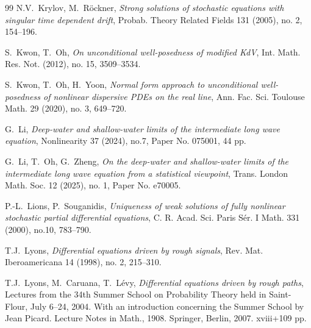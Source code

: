 \documentclass[letterpaper, 11pt,  reqno]{amsart}
\newcommand{\1}{\hspace{0.5mm}\text{I}\hspace{0.5mm}}
\numberwithin{equation}{section}
\numberwithin{theorem}{section}
\begin{document}
\begin{thebibliography}{99}
N.V.~Krylov,  M.~R\"ockner,
{\it Strong solutions of stochastic equations with singular time dependent drift},
Probab. Theory Related Fields 131 (2005), no. 2, 154--196. 



S.~Kwon, T.~Oh, 
{\it  On unconditional well-posedness of modified KdV}, Int. Math. Res. Not. (2012), no. 15, 3509--3534. 




S.~Kwon, T.~Oh, H.~Yoon, 
{\it Normal form approach to unconditional well-posedness of nonlinear dispersive PDEs on the real line}, Ann. Fac. Sci. Toulouse Math. 29 (2020), no. 3, 649--720. 



G.~Li, 
{\it Deep-water and shallow-water limits of the intermediate long wave equation}, 
 Nonlinearity 37 (2024), no.7, Paper No. 075001, 44 pp. 
 
 
G.~Li, T.~Oh, G.~Zheng,
{\it On the deep-water and shallow-water limits of the intermediate long wave equation from a statistical viewpoint}, 
Trans. London Math. Soc. 
 12 (2025), no. 1, Paper No. e70005. 




P.-L.~Lions, P.~Souganidis, 
{\it Uniqueness of weak solutions of fully nonlinear stochastic partial differential equations},
C. R. Acad. Sci. Paris S\'er. I Math. 331 (2000), no.10, 783--790.


T.J.~Lyons,
{\it Differential equations driven by rough signals},
Rev. Mat. Iberoamericana 14 (1998), no. 2, 215--310.




T.J.~Lyons, M.~Caruana, T.~L{\'e}vy,
{\it Differential equations driven by rough paths},
Lectures from the 34th Summer School on Probability Theory held in Saint-Flour, 
July 6--24, 2004. 
With an introduction concerning the Summer School by Jean Picard.
Lecture Notes in Math., 1908.
 Springer, Berlin, 2007. xviii+109 pp.


%
%
%


%
%
%
%



%
%




\end{thebibliography}
\end{document}

